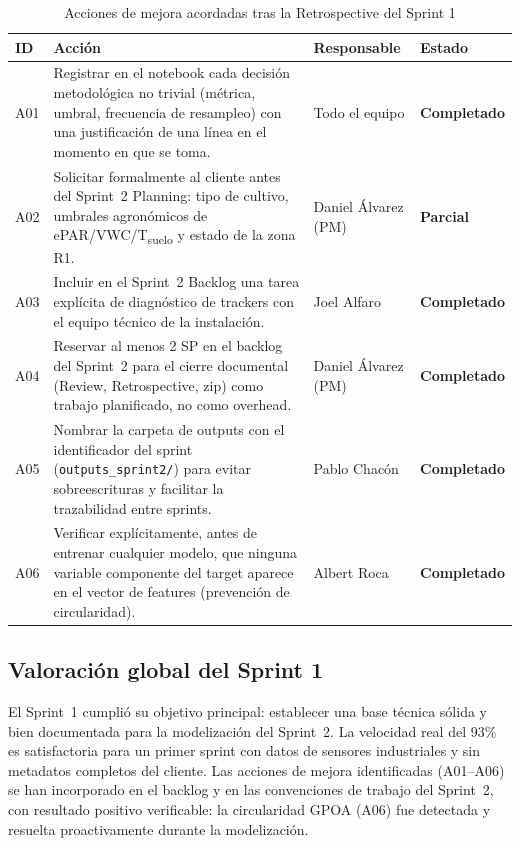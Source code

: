 \documentclass[12pt,a4paper]{article}
\newcommand{\done}{\textcolor{completed}{\textbf{Completado}}}
\newcommand{\part}{\textcolor{inprogress}{\textbf{Parcial}}}
\begin{document}
\begin{table}[H]
\centering
\caption{Acciones de mejora acordadas tras la Retrospective del Sprint 1}
\label{tab:retro_s1_acciones}
\renewcommand{\arraystretch}{1.4}
\begin{tabularx}{\textwidth}{p{0.7cm} X p{3cm} p{1.5cm}}
\toprule
\textbf{ID} & \textbf{Acción} & \textbf{Responsable} & \textbf{Estado} \\
\midrule
A01
  & Registrar en el notebook cada decisión metodológica no trivial (métrica, umbral, frecuencia de resampleo) con una justificación de una línea en el momento en que se toma.
  & Todo el equipo
  & \done \\
A02
  & Solicitar formalmente al cliente antes del Sprint~2 Planning: tipo de cultivo, umbrales agronómicos de ePAR/VWC/T\textsubscript{suelo} y estado de la zona R1.
  & Daniel Álvarez (PM)
  & \part \\
A03
  & Incluir en el Sprint~2 Backlog una tarea explícita de diagnóstico de trackers con el equipo técnico de la instalación.
  & Joel Alfaro
  & \done \\
A04
  & Reservar al menos 2 SP en el backlog del Sprint~2 para el cierre documental (Review, Retrospective, zip) como trabajo planificado, no como overhead.
  & Daniel Álvarez (PM)
  & \done \\
A05
  & Nombrar la carpeta de outputs con el identificador del sprint (\texttt{outputs\_sprint2/}) para evitar sobreescrituras y facilitar la trazabilidad entre sprints.
  & Pablo Chacón
  & \done \\
A06
  & Verificar explícitamente, antes de entrenar cualquier modelo, que ninguna variable componente del target aparece en el vector de features (prevención de circularidad).
  & Albert Roca
  & \done \\
\bottomrule
\end{tabularx}
\end{table}

\subsection{Valoración global del Sprint 1}

El Sprint~1 cumplió su objetivo principal: establecer una base técnica sólida y bien documentada para la modelización del Sprint~2. La velocidad real del 93\% es satisfactoria para un primer sprint con datos de sensores industriales y sin metadatos completos del cliente. Las acciones de mejora identificadas (A01--A06) se han incorporado en el backlog y en las convenciones de trabajo del Sprint~2, con resultado positivo verificable: la circularidad GPOA (A06) fue detectada y resuelta proactivamente durante la modelización.
\end{document}
